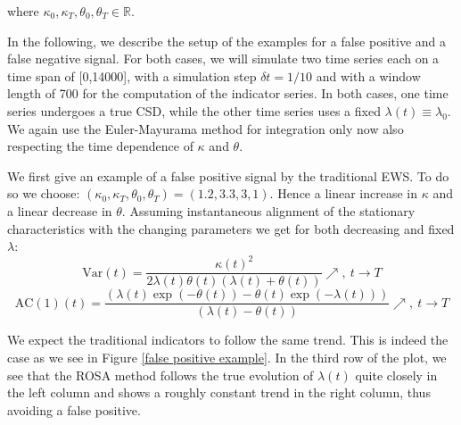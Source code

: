 \documentclass[%
thesis=student,%
coverpage=false,%
titlepage=false,%
headmarks=true, %
english,%
font=libertine, %
math=newpxtx, %
BCOR=5mm,%
coverBCOR=11mm%
]{tumbook}
\begin{document}
where $\kappa_{0},\kappa_{T},\theta_{0},\theta_{T} \in \mathbb{R}$. 

In the following, we describe the setup of the examples for a false positive and a false negative signal. For both cases, we will simulate two time series each on a time span of [0,14000], with a simulation step $\delta t = 1/10$ and with a window length of 700 for the computation of the indicator series. In both cases, one time series undergoes a true CSD, while the other time series uses a fixed $\lambda(t) \equiv \lambda_{0}$. We again use the Euler-Mayurama method for integration only now also respecting the time dependence of $\kappa$ and $\theta$.

We first give an example of a false positive signal by the traditional EWS. To do so we choose: $(\kappa_{0},\kappa_{T},\theta_{0},\theta_{T}) = (1.2,3.3,3,1)$. Hence a linear increase in $\kappa$ and a linear decrease in $\theta$. Assuming instantaneous alignment of the stationary characteristics with the changing parameters we get for both decreasing and fixed $\lambda$: 
\[
\mathrm{Var}(t) = \frac{\kappa(t)^2}{2\lambda(t)\theta(t)(\lambda(t) + \theta(t))} \nearrow, \ t \rightarrow T
\]
\[
\mathrm{AC}(1)(t) = \frac{(\lambda(t)\exp(-\theta(t))-\theta(t)\exp(-\lambda(t)))}{(\lambda(t)-\theta(t))} \nearrow, \ t \rightarrow T
\]

We expect the traditional indicators to follow the same trend. This is indeed the case as we see in Figure \ref{false positive example}. In the third row of the plot, we see that the ROSA method follows the true evolution of $\lambda(t)$ quite closely in the left column and shows a roughly constant trend in the right column, thus avoiding a false positive.
\end{document}
